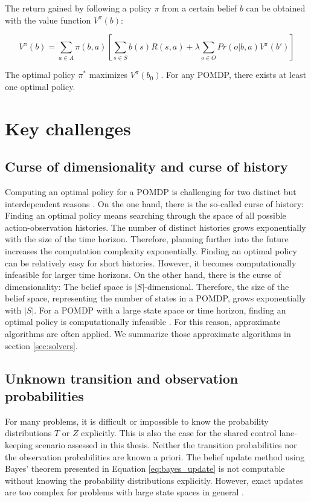 \noindent
The return gained by following a policy $\pi$ from a certain belief $b$ can be obtained with the value function $V^\pi(b)$:

\begin{equation}
    V^\pi(b) = \sum_{a \in A} \pi(b,a) \left[ \sum_{s \in S} b(s) R(s,a) + \lambda \sum_{o \in O} Pr(o | b, a) V^\pi(b')\right]
\end{equation}

\noindent
The optimal policy $\pi^*$ maximizes $V^\pi(b_0)$. For any POMDP, there exists at least one optimal policy.

\section{Key challenges}
\label{sec:challenges}

\subsection{Curse of dimensionality and curse of history}
\label{sec:curses}

Computing an optimal policy for a POMDP is challenging for two distinct but interdependent reasons \parencite{pomdp_curses}. On the one hand, there is the so-called curse of history: Finding an optimal policy means searching through the space of all possible action-observation histories. The number of distinct histories grows exponentially with the size of the time horizon. Therefore, planning further into the future increases the computation complexity exponentially. Finding an optimal policy can be relatively easy for short histories. However, it becomes computationally infeasible for larger time horizons. On the other hand, there is the curse of dimensionality: The belief space is $|S|$-dimensional. Therefore, the size of the belief space, representing the number of states in a POMDP, grows exponentially with $|S|$. For a POMDP with a large state space or time horizon, finding an optimal policy is computationally infeasible \parencite{pomdp_complex}. For this reason, approximate algorithms are often applied.  We summarize those approximate algorithms in section \ref{sec:solvers}.

\subsection{Unknown transition and observation probabilities}
\label{sec:gen_model_intro}
For many problems, it is difficult or impossible to know the probability distributions $T$ or $Z$ explicitly. This is also the case for the shared control lane-keeping scenario assessed in this thesis. Neither the transition probabilities nor the observation probabilities are known a priori. The belief update method using Bayes' theorem presented in Equation \ref{eq:bayes_update} is not computable without knowing the probability distributions explicitly. However, exact updates are too complex for problems with large state spaces in general \parencite{pomcp}. 

